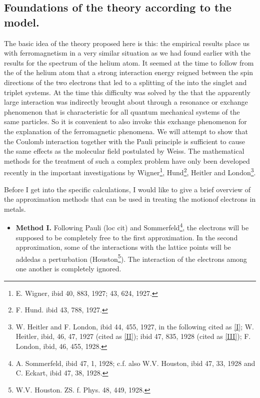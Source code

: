 \begin{paper}{1}
\section{Foundations of the theory according to the model.} The basic idea of the theory proposed here is this: the empirical results place us with ferromagnetism in a very similar situation as we had found earlier with the results for the spectrum of the helium atom. It seemed at the time to follow from the  of the helium atom that a strong interaction energy reigned between the spin directions of the two electrons that led to a splitting of the  into the singlet and triplet systems. At the time this difficulty was solved by the  that the apparently large interaction was indirectly brought about through a resonance or exchange phenomenon that is characteristic for all quantum mechanical systems of the same particles. So it is convenient to also invoke this exchange phenomenon for the explanation of the ferromagnetic phenomena.  We will attempt to show that the Coulomb interaction together with the Pauli principle is sufficient to cause the same effects as the molecular field postulated by Weiss. The mathematical methods for the treatment of such a complex problem have only been developed recently in the important investigations by Wigner\footnote{E. Wigner, ibid 40, 883, 1927; 43, 624, 1927.}, Hund\footnote{F. Hund. ibid 43, 788, 1927.}, Heitler and London\footnote{W. Heitler and F. London, ibid 44, 455, 1927, in the following cited as \ref{I}; W. Heitler, ibid, 46, 47, 1927 (cited as \ref{II}); ibid 47, 835, 1928 (cited as \ref{III}); F. London, ibid, 46, 455, 1928.}.

Before I get into the specific calculations, I would like to give a brief overview of the approximation methods that can be used in treating the motionof electrons in metals.

\begin{itemize}

\item
\textbf{Method I.} Following Pauli (loc cit) and Sommerfeld\footnote{A. Sommerfeld, ibid 47, 1, 1928; c.f. also W.V. Houston, ibid 47, 33, 1928 and C. Eckart, ibid 47, 38, 1928.}, the electrons will be supposed to be completely free to the first approximation. In the second approximation, some of the interactions with the lattice points will be addedas a perturbation (Houston\footnote{W.V. Houston. ZS. f. Phys. 48, 449, 1928.}). The interaction of the electrons among one another is completely ignored.


\end{itemize}
\end{paper}
